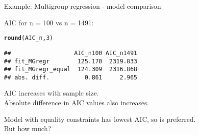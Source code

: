 \documentclass[10pt]{beamer}\usepackage[]{graphicx}\usepackage[]{xcolor}
\makeatletter
\newcommand{\hlnum}[1]{\textcolor[rgb]{0.686,0.059,0.569}{#1}}%
\newcommand{\hldef}[1]{\textcolor[rgb]{0.345,0.345,0.345}{#1}}%
\newcommand{\hlkwd}[1]{\textcolor[rgb]{0.737,0.353,0.396}{\textbf{#1}}}%
\newenvironment{kframe}{%
 \def\at@end@of@kframe{}%
 \ifinner\ifhmode%
  \def\at@end@of@kframe{\end{minipage}}%
  \begin{minipage}{\columnwidth}%
 \fi\fi%
 \def\FrameCommand##1{\hskip\@totalleftmargin \hskip-\fboxsep
 \colorbox{shadecolor}{##1}\hskip-\fboxsep
     \hskip-\linewidth \hskip-\@totalleftmargin \hskip\columnwidth}%
 \MakeFramed {\advance\hsize-\width
   \@totalleftmargin\z@ \linewidth\hsize
   \@setminipage}}%
 {\par\unskip\endMakeFramed%
 \at@end@of@kframe}
\newenvironment{knitrout}{}{} %
\makeatother
\begin{document}
%
%
\begin{frame}[fragile]{Example: Multigroup regression - model comparison}

AIC for n = 100 vs n = 1491: %



\begin{knitrout}
\color{fgcolor}\begin{kframe}
\begin{alltt}
\hlkwd{round}\hldef{(AIC_n,} \hlnum{3}\hldef{)}
\end{alltt}
\begin{verbatim}
##                  AIC_n100 AIC_n1491
## fit_MGregr        125.170  2319.833
## fit_MGregr_equal  124.309  2316.868
## abs. diff.          0.861     2.965
\end{verbatim}
\end{kframe}
\end{knitrout}

AIC increases with sample size.\\
Absolute difference in AIC values also increases.\\

\vspace{\baselineskip}

Model with equality constraints has lowest AIC, so is preferred.\\
But how much?

\end{frame}
%
\end{document}
